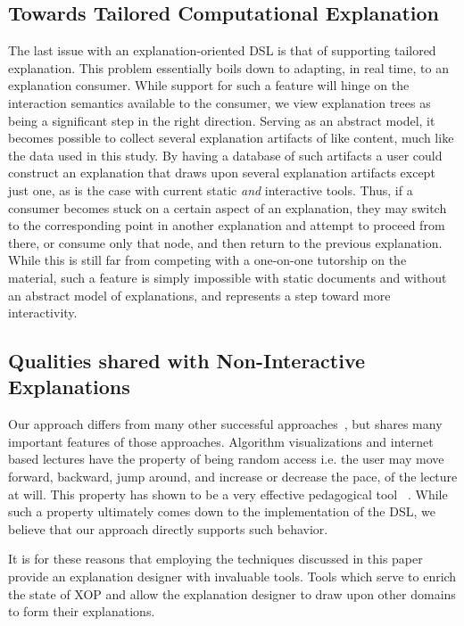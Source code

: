 \documentclass[sigconf]{acmart}
\begin{document}
\subsection{Towards Tailored Computational Explanation}
\label{sec:dis:tail}
The last issue with an explanation-oriented DSL is that of supporting tailored
explanation. This problem essentially boils down to 
adapting, in real time, to an explanation consumer. While support for such a
feature will hinge on the interaction semantics available to the consumer, we
view explanation trees as being a significant step in the right direction.
Serving as an abstract model, it becomes possible to collect several explanation
artifacts of like content, much like the data used in this study. By having a
database of such artifacts a user could construct an explanation that draws upon
several explanation artifacts except just one, as is the case with current
static \emph{and} interactive tools. Thus, if a consumer becomes stuck on a
certain aspect of an explanation, they may switch to the corresponding point in
another explanation and attempt to proceed from there, or consume only that
node, and then return to the previous explanation. While this is still far
from competing with a one-on-one tutorship on the material, such a feature is
simply impossible with static documents and without an abstract model of
explanations, and represents a step toward more interactivity.  

\subsection{Qualities shared with Non-Interactive Explanations}
Our approach differs from many other successful
approaches~\cite{brecht2012learning, brecht2008enabling}, but shares many
important features of those approaches. Algorithm visualizations and internet
based lectures have the property of being random access i.e. the user may move
forward, backward, jump around, and increase or decrease the pace, of the
lecture at will. This property has shown to be a very effective pedagogical
tool~\cite{cardall2008live, zhang2005interactive, zhang2006instructional,
  Schwan2004293, Merkt2011687} . While such a property ultimately comes down to
the implementation of the DSL, we believe that our approach directly supports
such behavior.

It is for these reasons that employing the techniques discussed in this paper
provide an explanation designer with invaluable tools. Tools which serve to
enrich the state of XOP and allow the explanation designer to draw upon other
domains to form their explanations.
\end{document}
